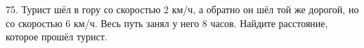 75. Турист шёл в гору со скоростью 2 км/ч, а обратно он шёл той же дорогой, но со скоростью 6 км/ч. Весь путь занял у него 8 часов. Найдите расстояние, которое прошёл турист.\\
